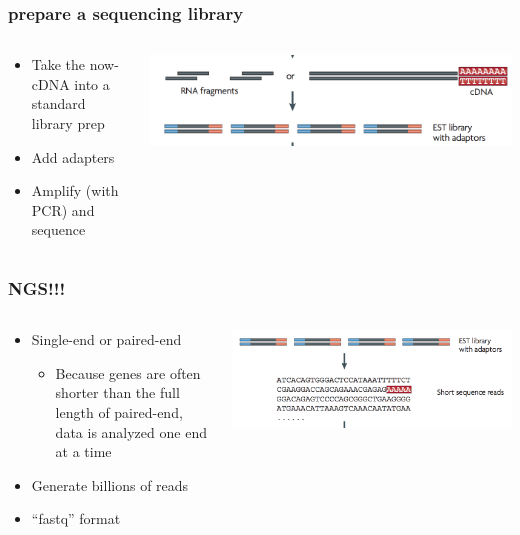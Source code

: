 \documentclass[14pt]{beamer}
\begin{document}
\begin{frame}
\frametitle{prepare a sequencing library}
\begin{columns}
	\begin{column}{0.5\textwidth}
	\begin{itemize}
		\item<+-> Take the now-cDNA into a standard library prep
		\item<+-> Add adapters
		\item<+-> Amplify (with PCR) and sequence
	\end{itemize}
	\end{column}
	\begin{column}{0.5\textwidth}
	\begin{center}
    	\includegraphics[width=1\textwidth]{images_20170912_libprep.png}
    \end{center}
	\end{column}
\end{columns}
\end{frame}

\begin{frame}
\frametitle{NGS!!!}
\begin{columns}
	\begin{column}{0.5\textwidth}
	\begin{itemize}
		\item<+-> Single-end or paired-end
		\begin{itemize}
			\item<+-> Because genes are often shorter than the full length of paired-end, data is analyzed one end at a time
		\end{itemize}
		\item<+-> Generate billions of reads
		\item<+-> ``fastq'' format
	\end{itemize}
	\end{column}
	\begin{column}{0.5\textwidth}
	\begin{center}
    	\includegraphics[width=1\textwidth]{images_20170912_seq.png}
    \end{center}
	\end{column}
\end{columns}
\end{frame}
\end{document}
